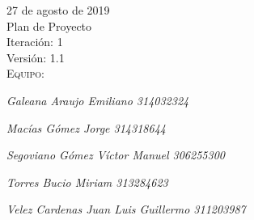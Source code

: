 \begin{titlepage}
\begin{center}
         \begin{center}
           
         \end{center}
         \vspace{1mm} %
         \vspace{1mm} %
                {\huge 27 de agosto de 2019}\\[1cm]
                \vspace{1mm} %
                       {\huge Plan de Proyecto}\\[1cm]
                       \vspace{1mm} %
                              {\huge Iteración: 1}\\[1cm]
                              \vspace{1mm} %
                                     {\huge Versión: 1.1}\\[1cm]
                                     \vspace{1mm} %
                                            {\huge \scshape Equipo:}\\
                                            {\Large\itshape Galeana Araujo Emiliano 314032324\par}
                                            {\Large\itshape Macías Gómez Jorge 314318644\par}
                                            {\Large\itshape Segoviano Gómez Víctor Manuel 306255300\par}
                                            {\Large\itshape Torres Bucio Miriam 313284623\par}
                                            {\Large\itshape Velez Cardenas Juan Luis Guillermo 311203987\par}
                                            \vspace{3mm}


                                            \vspace{10mm} %

                                            \vfill %

  \end{center}
\end{titlepage}
